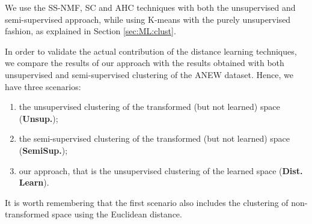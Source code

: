 

We use the SS-NMF, SC and AHC techniques with both the unsupervised and semi-supervised  approach, while using K-means with the purely unsupervised fashion, as explained in Section \ref{sec:ML:clust}.



In order to validate the actual contribution of the distance learning techniques, we compare the results of our approach with the results obtained with both unsupervised and semi-supervised clustering of the ANEW dataset. Hence, we have three scenarios: 
\begin{enumerate}
\item the unsupervised clustering of the transformed (but not learned) space (\textbf{Unsup.});
\item the semi-supervised clustering of the transformed (but not learned) space (\textbf{SemiSup.}); 
\item our approach, that is the unsupervised clustering of the learned space (\textbf{Dist. Learn}).
\end{enumerate} 
It is worth remembering that the first scenario also includes the clustering of non-transformed space using the Euclidean distance. 

